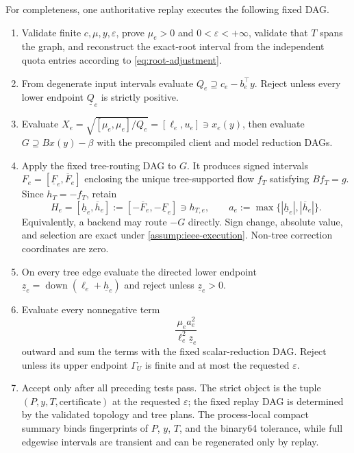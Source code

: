 For completeness, one authoritative replay executes the following fixed DAG.
\begin{enumerate}[leftmargin=*,itemsep=2pt]
 \item Validate finite $c,\mu,y,\varepsilon$, prove $\mu_e>0$ and
 $0<\varepsilon<+\infty$, validate that $T$ spans the graph, and reconstruct
 the exact-root interval from the independent quota entries according to
 \cref{eq:root-adjustment}.
 \item From degenerate input intervals evaluate
 $Q_e\supseteq c_e-b_e^\top y$.  Reject unless every lower endpoint
 $\underline Q_e$ is strictly positive.
 \item Evaluate
 $X_e=\sqrt{[\mu_e,\mu_e]/Q_e}=[\ell_e,u_e]\ni x_e(y)$, then evaluate
 $G\supseteq Bx(y)-\beta$ with the precompiled client and model reduction DAGs.
 \item Apply the fixed tree-routing DAG to $G$.  It produces signed intervals
 $F_e=[\underline F_e,\overline F_e]$ enclosing the unique tree-supported flow
 $f_T$ satisfying $Bf_T=g$.  Since $h_T=-f_T$, retain
 \[
  H_e=[\underline h_e,\overline h_e]
     :=[-\overline F_e,-\underline F_e]\ni h_{T,e},\qquad
  a_e:=\max\{|\underline h_e|,|\overline h_e|\}.
 \]
 Equivalently, a backend may route $-G$ directly.  Sign change, absolute value,
 and selection are exact under \cref{assump:ieee-execution}.  Non-tree
 correction coordinates are zero.
 \item On every tree edge evaluate the directed lower endpoint
 $\underline z_e=\operatorname{down}(\ell_e+\underline h_e)$ and reject unless
 $\underline z_e>0$.
 \item Evaluate every nonnegative term
 \[
   \frac{\mu_ea_e^2}{\ell_e^2\underline z_e}
 \]
 outward and sum the terms with the fixed scalar-reduction DAG.  Reject unless
 its upper endpoint $\Gamma_U$ is finite and at most the requested
 $\varepsilon$.
 \item Accept only after all preceding tests pass.  The strict object is the tuple
 $(P,y,T,\text{certificate})$ at the requested $\varepsilon$; the fixed replay
 DAG is determined by the validated topology and tree plans.  The process-local
 compact summary binds fingerprints of $P$, $y$, $T$, and the binary64
 tolerance, while full edgewise intervals are transient and can be regenerated
 only by replay.
\end{enumerate}

